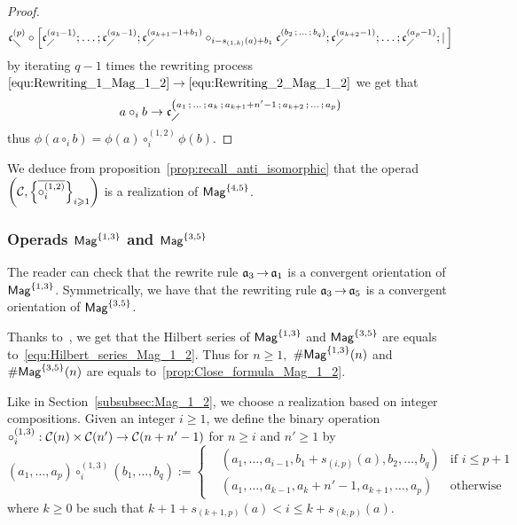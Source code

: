\begin{proof}
\begin{equation}
\mathfrak{c}^{\left(p\right)}_{\diagdown} \circ \left[\mathfrak{c}^{\left(a_1-1\right)}_{\diagup}; \dots ; \mathfrak{c}^{\left(a_k-1\right)}_{\diagup};
\mathfrak{c}^{\left(a_{k+1}-1+b_1\right)}_{\diagup} \circ_{i-s_{(1,k)}(a)+b_1}
\mathfrak{c}^{\left(b_2 \, ; \, \dots \, ; \, b_q\right)}_{\diagup}  ; \mathfrak{c}^{\left(a_{k+2}-1\right)}_{\diagup} ; \dots;
\mathfrak{c}^{\left(a_p-1\right)}_{\diagup} ; | \, \right]
\end{equation}
by iterating $q-1$ times the rewriting process
$\eqref{equ:Rewriting_1_Mag_1_2} \rightarrow
\eqref{equ:Rewriting_2_Mag_1_2}$ we get that
\begin{equation}
a \circ_i b \rightarrow \mathfrak{c}^{\left(a_1 \, ; \, \dots \, ; \, a_{k} \, ; \,
a_{k+1} + n'-1 \, ; \, a_{k+2} \, ; \, \dots \, ; \, a_p\right)}_{\diagup}
\end{equation}
thus $\phi(a \circ_i b) = \phi(a) \circ_i^{(1,2)} \phi(b)$.
\end{proof}

We deduce from proposition~\ref{prop:recall_anti_isomorphic} that the
 operad $\left(\mathcal{C},
 \left\{\overline{\circ_i^{(1,2)}}\right\}_{i \geqslant 1}\right)$
is a realization of $\mathsf{Mag}^{\{4, 5\}}$.
\medbreak

\subsubsection{Operads $\mathsf{Mag}^{\{1, 3\}}$ and $\mathsf{Mag}^{\{3, 5\}}$}
The reader can check that the rewrite rule $\mathfrak{a}_3 \operatorname{\to} \mathfrak{a}_1$ is a
convergent orientation of $\mathsf{Mag}^{\{1, 3\}}$. Symmetrically, we have that the
rewriting rule $\mathfrak{a}_3 \operatorname{\to} \mathfrak{a}_5$ is a convergent orientation of
$\mathsf{Mag}^{\{3, 5\}}$.
\medbreak

Thanks to~\cite{Gir18}, we get that the Hilbert series of $\mathsf{Mag}^{\{1, 3\}}$
and $\mathsf{Mag}^{\{3, 5\}}$ are equals to~\eqref{equ:Hilbert_series_Mag_1_2}. Thus
for $n \geq 1,$ $\# \mathsf{Mag}^{\{1, 3\}}(n)$ and $\# \mathsf{Mag}^{\{3, 5\}}(n)$ are equals
to~\eqref{prop:Close_formula_Mag_1_2}.
\medbreak

Like in Section~\ref{subsubsec:Mag_1_2}, we choose a realization based on
integer compositions. Given an integer $i \geq 1$, we define the
binary operation
$\circ_i^{(1,3)} : \mathcal{C}(n) \times \mathcal{C}(n')\rightarrow
\mathcal{C}(n + n' -1)$ for
$n \geq i$ and $n' \geq 1$ by
\begin{equation}
\left(a_1 , \dots, a_p\right) \circ_i^{(1,3)}
\left(b_1, \dots ,b_{q}\right) := \left\{
 \begin{split}
 & \left(a_1, \dots ,a_{i-1}, b_1 + s_{(i,p)}(a),b_2,\dots,b_{q}\right)
 & \text{if } i \leq p + 1\\
 & \left(a_1, \dots, a_{k-1}, a_{k} + n'-1, a_{k+1},\dots,a_{p}\right)
  & \text{otherwise}
 \end{split}
\right.
\end{equation} 
where $k \geq 0$ be such that
$k+1 + s_{(k+1,p)}(a) < i \leq k + s_{(k,p)}(a)$.

